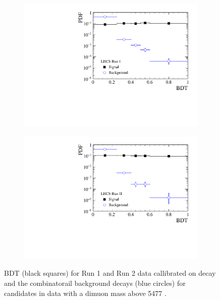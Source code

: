 \begin{figure}[htbp]
    \centering
   \begin{subfigure}[b]{0.48\textwidth}
        \includegraphics[width= \textwidth]{./Figs/BFAnalysis/C_macros/BDT_calibration_Run1.pdf}
    \end{subfigure}
    \begin{subfigure}[b]{0.48\textwidth}
       \includegraphics[width=\textwidth]{./Figs/BFAnalysis/C_macros/BDT_calibration_Run2.pdf}
   \end{subfigure}
    \caption{\bmumu BDT \pdfs (black squares) for Run 1 and Run 2 data callibrated on \bdkpi decay and the combinatorail background decays (blue circles) for \bmumu candidates in data with a dimuon mass above 5477 \mevcc. }
    \label{fig:BDT\pdfs}
\end{figure}


